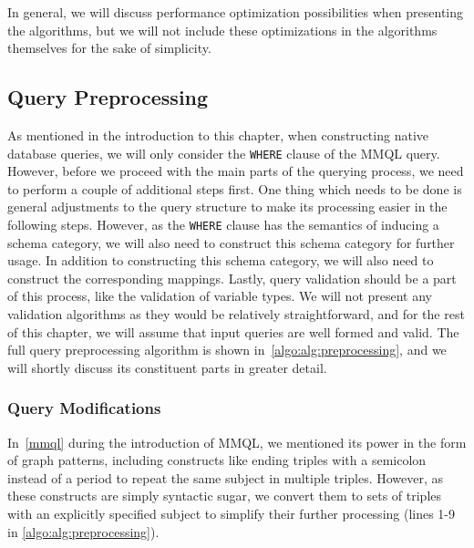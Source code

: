 In general, we will discuss performance optimization possibilities when presenting the algorithms, but we will not include these optimizations in the algorithms themselves for the sake of simplicity.

\subsection{Query Preprocessing}
\label{algorithms:subsection:preprocessing}

As mentioned in the introduction to this chapter, when constructing native database queries, we will only consider the \texttt{WHERE} clause of the MMQL query.
However, before we proceed with the main parts of the querying process, we need to perform a couple of additional steps first.
One thing which needs to be done is general adjustments to the query structure to make its processing easier in the following steps.
However, as the \texttt{WHERE} clause has the semantics of inducing a schema category, we will also need to construct this schema category for further usage.
In addition to constructing this schema category, we will also need to construct the corresponding mappings.
Lastly, query validation should be a part of this process, like the validation of variable types.
We will not present any validation algorithms as they would be relatively straightforward, and for the rest of this chapter, we will assume that input queries are well formed and valid.
The full query preprocessing algorithm is shown in~\cref{algo:alg:preprocessing}, and we will shortly discuss its constituent parts in greater detail.

\subsubsection{Query Modifications}

In~\cref{mmql} during the introduction of MMQL, we mentioned its power in the form of graph patterns, including constructs like ending triples with a semicolon instead of a period to repeat the same subject in multiple triples.
However, as these constructs are simply syntactic sugar, we convert them to sets of triples with an explicitly specified subject to simplify their further processing (lines 1-9 in \cref{algo:alg:preprocessing}).

